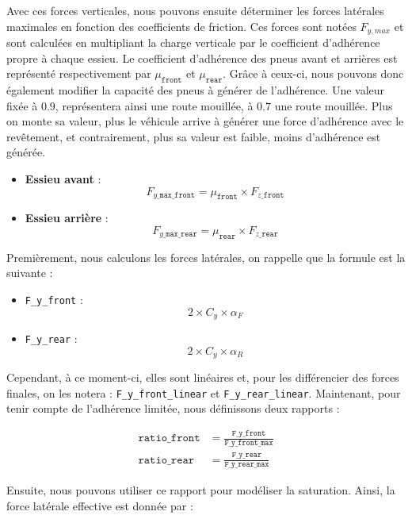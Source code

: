 Avec ces forces verticales, nous pouvons ensuite déterminer les forces latérales maximales en fonction des coefficients de friction.
Ces forces sont notées $F_{y, max}$ et sont calculées en multipliant la charge verticale par le coefficient d'adhérence propre à chaque essieu.
Le coefficient d'adhérence des pneus avant et arrières est représenté respectivement par $\mu_{\texttt{front}}$ et $\mu_{\texttt{rear}}$.
Grâce à ceux-ci, nous pouvons donc également modifier la capacité des pneus à générer de l'adhérence.
Une valeur fixée à $0.9$, représentera ainsi une route mouillée, à $0.7$ une route mouillée.
Plus on monte sa valeur, plus le véhicule arrive à générer une force d'adhérence avec le revêtement, et contrairement, plus sa valeur est faible, moins d'adhérence est générée.

\begin{itemize}
    \item \textbf{Essieu avant} :
    $$F_{y\_\texttt{max\_front}}= \mu_{\texttt{front}} \times F_{z\_\texttt{front}}$$
    \item \textbf{Essieu arrière} :
    $$F_{y\_\texttt{max\_rear}} = \mu_{\texttt{rear}} \times F_{z\_\texttt{rear}}$$
\end{itemize}

Premièrement, nous calculons les forces latérales, on rappelle que la formule est la suivante :

\begin{itemize}
    \item \texttt{F\_y\_front} : $$2 \times C_y \times \alpha_F$$
    \item \texttt{F\_y\_rear} : $$2 \times C_y \times \alpha_R$$
\end{itemize}

Cependant, à ce moment-ci, elles sont linéaires et, pour les différencier des forces finales, on les notera : \texttt{F\_y\_front\_linear} et \texttt{F\_y\_rear\_linear}.
Maintenant, pour tenir compte de l'adhérence limitée, nous définissons deux rapports :

\begin{align}
    \texttt{ratio\_front} &= \frac{\texttt{F\_y\_front}}{\texttt{F\_y\_front\_max}} \\
    \texttt{ratio\_rear} &= \frac{\texttt{F\_y\_rear}}{\texttt{F\_y\_rear\_max}}
\end{align}

Ensuite, nous pouvons utiliser ce rapport pour modéliser la saturation.
Ainsi, la force latérale effective est donnée par :

